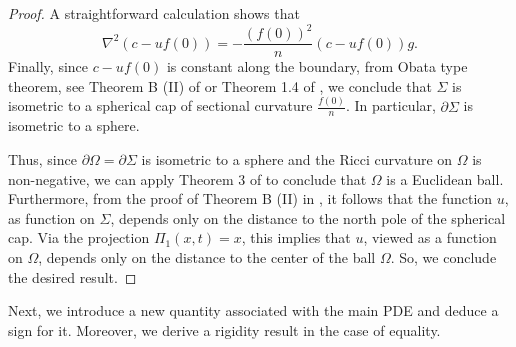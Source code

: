\documentclass[12pt]{amsart}
\theoremstyle{plain}
\numberwithin{equation}{section}
\begin{document}
\begin{proof}
A straightforward calculation shows that
$$\nabla^2(c-uf(0))=-\frac{(f(0))^2}{n}(c-uf(0))g.$$
Finally, since $c-uf(0)$ is constant along the boundary, from Obata type theorem, see Theorem B (II) of \cite{reilly} or Theorem 1.4 of \cite{CLW21}, we conclude that $\Sigma$ is isometric to a spherical cap of sectional curvature $\frac{f(0)}{n}$. In particular, $\partial\Sigma$ is isometric to a sphere.

Thus, since $\partial\Omega = \partial\Sigma$ is isometric to a sphere and the Ricci curvature on $\Omega$ is non-negative, we can apply Theorem 3 of \cite{X97} to conclude that $\Omega$ is a Euclidean ball. Furthermore, from the proof of Theorem B (II) in \cite{reilly}, it follows that the function $u$, as function on $\Sigma$, depends only on the distance to the north pole of the spherical cap. Via the projection $\Pi_1(x,t) = x$, this implies that $u$, viewed as a function on $\Omega$, depends only on the distance to the center of the ball $\Omega$. So, we conclude the desired result.
\end{proof}
\newpage

Next, we introduce a new quantity associated with the main PDE and deduce a sign for it. Moreover, we derive a rigidity result in the case of equality.
\end{document}
